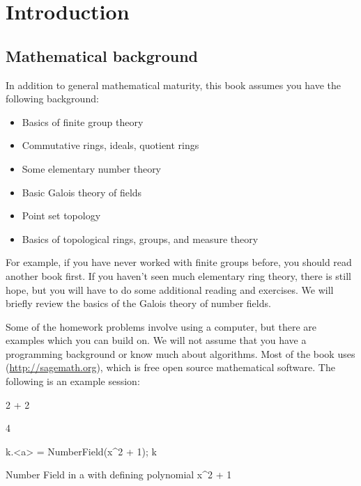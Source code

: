 
\chapter{Introduction}

\section{Mathematical background}

In addition to general mathematical maturity,
this book assumes you have the following background:
\begin{itemize}
  \item Basics of finite group theory
  \item Commutative rings, ideals, quotient rings
  \item Some elementary number theory
  \item Basic Galois theory of fields
  \item Point set topology
  \item Basics of topological rings, groups, and measure theory
\end{itemize}
For example, if you have never worked with finite groups before, you
should read another book first. If you haven't seen much elementary
ring theory, there is still hope, but you will have to do some
additional reading and exercises.  We will briefly review the basics of
the Galois theory of number fields.

Some of the homework problems involve using a computer, but there
are examples which you can build on.  We will not assume that you have
a programming background or know much about algorithms. Most
of the book uses {\Sage} (\url{http://sagemath.org}), which is
free open source mathematical software.  The following is an example
{\Sage} session:
\begin{sagecode}
\begin{sagecell}
2 + 2
\end{sagecell}
\begin{sageout}
4
\end{sageout}
\begin{sagecell}
k.<a> = NumberField(x^2 + 1); k
\end{sagecell}
\begin{sageout}
Number Field in a with defining polynomial x^2 + 1
\end{sageout}
\end{sagecode}


